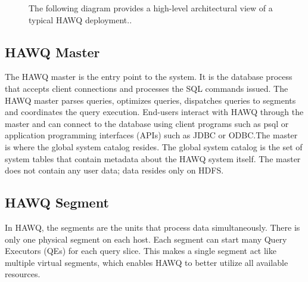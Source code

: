 \documentclass[9pt,twocolumn,twoside]{styles/osajnl}
\begin{document}
\begin{figure}[htbp]
	\centering
	\caption{{The following diagram provides a high-level 
	architectural view of a typical HAWQ 
	deployment.}\cite{www-hawq-arch-image}.}
	\label{fig:false-color}
\end{figure}

\subsection{HAWQ Master}

The HAWQ master is the entry point to the system. It is the database 
process that accepts client connections and processes the SQL 
commands issued. The HAWQ master parses queries, optimizes queries, 
dispatches queries to segments and coordinates the query execution.
End-users interact with HAWQ through the master and can connect to 
the database using client programs such as psql or application 
programming interfaces (APIs) such as JDBC or ODBC.The master is 
where the global system catalog resides. The global system catalog is 
the set of system tables that contain metadata about the HAWQ system 
itself. The master does not contain any user data; data resides only 
on HDFS. 

\subsection{HAWQ Segment}

In HAWQ, the segments are the units that process data simultaneously. 
There is only one physical segment on each host. Each segment can 
start many Query Executors (QEs) for each query slice. This makes a 
single segment act like multiple virtual segments, which enables HAWQ 
to better utilize all available resources.
\end{document}
